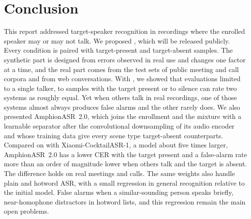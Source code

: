 
\section{Conclusion}
\label{sec:conclusion}

This report addressed target-speaker recognition in recordings where the enrolled speaker may or may not talk.
We proposed \tsbench, which will be released publicly.
Every condition is paired with target-present and target-absent samples.
The synthetic part is designed from errors observed in real use and changes one factor at a time, and the real part comes from the test sets of public meeting and call corpora and from web conversations.
With \tsbench, we showed that evaluations limited to a single talker, to samples with the target present or to silence can rate two systems as roughly equal.
Yet when others talk in real recordings, one of those systems almost always produces false alarms and the other rarely does.
We also presented AmphionASR~2.0, which joins the enrollment and the mixture with a learnable separator after the convolutional downsampling of its audio encoder and whose training data give every scene type target-absent counterparts.
Compared on \tsbench with Xiaomi-CocktailASR-1, a model about five times larger, AmphionASR~2.0 has a lower CER with the target present and a false-alarm rate more than an order of magnitude lower when others talk and the target is absent.
The difference holds on real meetings and calls.
The same weights also handle plain and hotword ASR, with a small regression in general recognition relative to the initial model.
False alarms when a similar-sounding person speaks briefly, near-homophone distractors in hotword lists, and this regression remain the main open problems.
